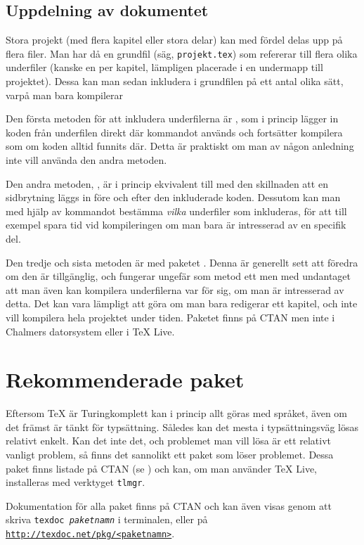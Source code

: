 \documentclass[10pt,../../a4.tex]{subfiles}
\begin{document}
\subsection{Uppdelning av dokumentet}
Stora projekt (med flera kapitel eller stora delar) kan med fördel delas
upp på flera filer. Man har då en grundfil (säg, \texttt{projekt.tex}) som
refererar till flera olika underfiler (kanske en per kapitel, lämpligen
placerade i en undermapp till projektet). Dessa kan man sedan inkludera
i grundfilen på ett antal olika sätt, varpå man bara kompilerar

Den första metoden för att inkludera underfilerna är , som i
princip lägger in koden från underfilen direkt där kommandot används och
fortsätter kompilera som om koden alltid funnits där. Detta är praktiskt
om man av någon anledning inte vill använda den andra metoden.

Den andra metoden, , är i princip ekvivalent till 
med den skillnaden att en sidbrytning läggs in före och efter den 
inkluderade koden. Dessutom kan man med hjälp av kommandot
 bestämma \emph{vilka} underfiler som inkluderas, för att
till exempel spara tid vid kompileringen om man bara är intresserad av en
specifik del.

Den tredje och sista metoden är med paketet . Denna är
generellt sett att föredra om den är tillgänglig, och fungerar ungefär som
metod ett men med undantaget att man även kan kompilera underfilerna
var för sig, om man är intresserad av detta. Det kan vara lämpligt att
göra om man bara redigerar ett kapitel, och inte vill kompilera hela
projektet under tiden. Paketet  finns på CTAN men inte i
Chalmers datorsystem eller i \TeX{} Live.

\section{Rekommenderade paket}
Eftersom \TeX{} är Turingkomplett kan i princip allt göras med språket,
även om det främst är tänkt för typsättning. Således kan det mesta i 
typsättningsväg lösas relativt enkelt. Kan det inte det, och problemet
man vill lösa är ett relativt vanligt problem, så finns det sannolikt ett
paket som löser problemet. Dessa paket finns listade på CTAN (se
) och kan, om man använder \TeX{} Live, installeras
med verktyget \texttt{tlmgr}.

Dokumentation för alla paket finns på CTAN och kan
även visas genom att skriva \texttt{texdoc \emph{paketnamn}} i terminalen,
eller på
\href{http://texdoc.net}{\nolinkurl{http://texdoc.net/pkg/<paketnamn>}}.
\end{document}
